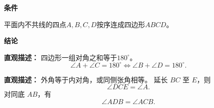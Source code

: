 \begin{statementbox}
	\textbf{\textcolor{CStatement}{条件}}
	\begin{description}[style=nextline, leftmargin=2.8em, labelsep=0.5em, itemsep=0.35em]
		\item[\textbf{\textcolor{CStatement}{条件1（四点不共线）：}}] 平面内不共线的四点$A,B,C,D$按序连成四边形$ABCD$。
	\end{description}

	\textbf{\textcolor{CStatement}{结论}}
	\begin{description}[style=nextline, leftmargin=2.8em, labelsep=0.5em, itemsep=0.45em]
		\item[\textbf{\textcolor{CStatement}{结论一（对角互补）：}}]
			\textbf{\textcolor{CStatement}{直观描述：}}
			四边形一组对角之和等于$180^\circ$。
			\[
				\angle A+\angle C=180^\circ \iff \angle B+\angle D=180^\circ .
			\]

		\item[\textbf{\textcolor{CStatement}{推广结论（外角内角等）：}}]
			\textbf{\textcolor{CStatement}{直观描述：}}
			外角等于内对角，或同侧张角相等。
			延长 $BC$ 至 $E$，则
			\[
				\angle DCE=\angle A .
			\]
			对同底 $AB$，有
			\[
				\angle ADB=\angle ACB .
			\]
	\end{description}
\end{statementbox}
